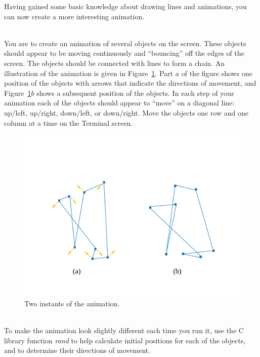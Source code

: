 \documentclass[epsfig,10pt,fullpage]{article}
\begin{document}
\noindent
Having gained some basic knowledge about drawing lines and animations, you can now create 
a more interesting animation.

~\\
\noindent
You are to create an animation of several objects on the screen. These objects should appear 
to be moving continuously and ``bouncing'' off the edges of the screen. The objects should 
be connected with lines to form a chain. An illustration of the animation is given in 
Figure~\ref{fig:animation_example}. Part $a$ of the figure shows one position
of the objects with arrows that indicate the directions of movement, and 
Figure~\ref{fig:animation_example}$b$ shows a subsequent position of the objects. 
In each step of your animation each of the objects should appear to ``move'' on a diagonal 
line: up/left, up/right, down/left, or down/right. Move the objects one row and one column 
at a time on the Terminal screen.

\begin{figure}[h!]
   \begin{center}
       \includegraphics[scale = 0.5]{figures/fig_animation_example.pdf}
   \end{center}
   \caption{Two instants of the animation.}
	\label{fig:animation_example}
\end{figure}

~\\
\noindent
To make the animation look slightly different each time you run it, use the C library function 
{\it rand} to help calculate initial positions for each of the objects, and to determine 
their directions of movement. 
\end{document}
